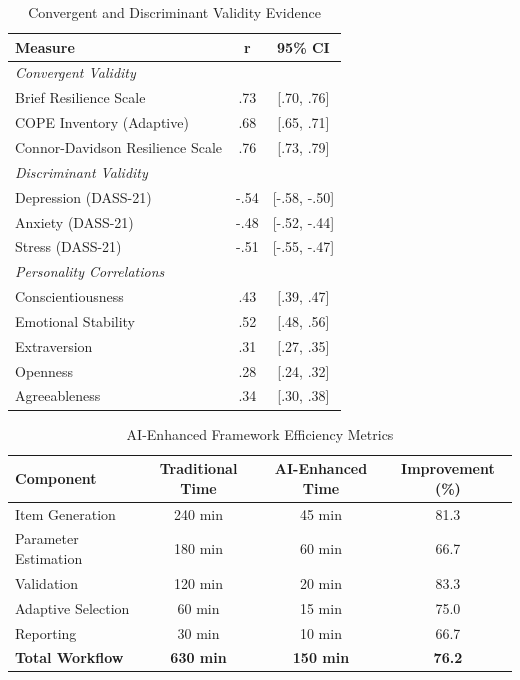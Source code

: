 \documentclass[12pt,a4paper]{article}
\begin{document}
\begin{table}[ht]
\centering
\caption{Convergent and Discriminant Validity Evidence}
\label{tab:validity-evidence}
\begin{tabular}{lcc}
\toprule
Measure & r & 95\% CI \\
\midrule
\multicolumn{3}{l}{\textit{Convergent Validity}} \\
Brief Resilience Scale & .73 & [.70, .76] \\
COPE Inventory (Adaptive) & .68 & [.65, .71] \\
Connor-Davidson Resilience Scale & .76 & [.73, .79] \\
\midrule
\multicolumn{3}{l}{\textit{Discriminant Validity}} \\
Depression (DASS-21) & -.54 & [-.58, -.50] \\
Anxiety (DASS-21) & -.48 & [-.52, -.44] \\
Stress (DASS-21) & -.51 & [-.55, -.47] \\
\midrule
\multicolumn{3}{l}{\textit{Personality Correlations}} \\
Conscientiousness & .43 & [.39, .47] \\
Emotional Stability & .52 & [.48, .56] \\
Extraversion & .31 & [.27, .35] \\
Openness & .28 & [.24, .32] \\
Agreeableness & .34 & [.30, .38] \\
\bottomrule
\end{tabular}
\end{table}

\begin{table}[ht]
\centering
\caption{AI-Enhanced Framework Efficiency Metrics}
\label{tab:efficiency-metrics}
\begin{tabular}{lccc}
\toprule
Component & Traditional Time & AI-Enhanced Time & Improvement (\%) \\
\midrule
Item Generation & 240 min & 45 min & 81.3 \\
Parameter Estimation & 180 min & 60 min & 66.7 \\
Validation & 120 min & 20 min & 83.3 \\
Adaptive Selection & 60 min & 15 min & 75.0 \\
Reporting & 30 min & 10 min & 66.7 \\
\midrule
\textbf{Total Workflow} & \textbf{630 min} & \textbf{150 min} & \textbf{76.2} \\
\bottomrule
\end{tabular}
\end{table}
\end{document}
